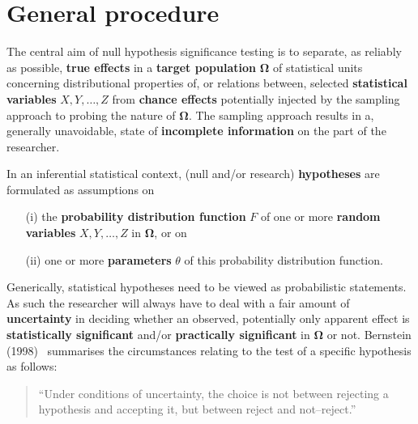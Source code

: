 \section[General procedure]{General procedure}
The central aim of null hypothesis significance testing is to 
separate, as reliably as possible, \textbf{true effects} in a
\textbf{target population} $\boldsymbol{\Omega}$ of statistical
units concerning distributional properties of, or relations
between, selected \textbf{statistical variables} $X, Y, \ldots, Z$
from \textbf{chance effects} potentially injected by the sampling
approach to probing the nature of $\boldsymbol{\Omega}$. The
sampling approach results in a, generally unavoidable, state of
\textbf{incomplete information} on the part of the researcher.

\medskip
\noindent
In an inferential statistical context, (null and/or research)
\textbf{hypotheses} are formulated as assumptions on\\[-5mm]
%
\begin{itemize}
\item[(i)] the \textbf{probability distribution function} $F$ of
one or more \textbf{random variables} $X, Y, \ldots, Z$ in 
$\boldsymbol{\Omega}$, or on\\[-5mm]

\item[(ii)] one or more \textbf{parameters} $\theta$ of this
probability distribution function.\\[-5mm]
\end{itemize}
%
Generically, statistical hypotheses need to be viewed as 
probabilistic statements. As such the researcher will always have 
to deal with a fair amount of \textbf{uncertainty} in deciding 
whether an observed, potentially only apparent effect is
\textbf{statistically significant} and/or \textbf{practically
significant} in $\boldsymbol{\Omega}$ or not. Bernstein
(1998)~ summarises the circumstances relating to
the test of a specific hypothesis as follows:
%
\begin{quotation}
``Under conditions of uncertainty, the choice is not between 
rejecting a hypothesis and accepting it, but between reject and 
not--reject.''
\end{quotation}
%

